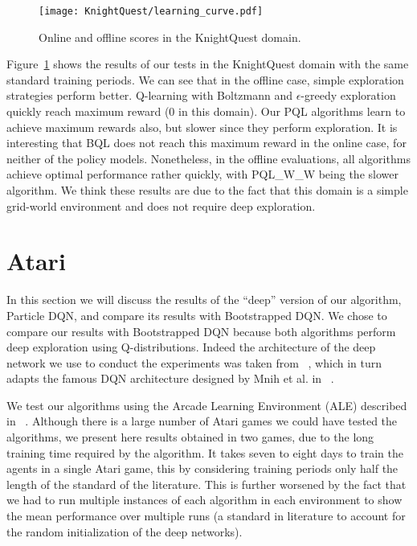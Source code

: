 \begin{figure}
 \texttt{[image: KnightQuest/learning\_curve.pdf]}
 \caption{Online and offline scores in the KnightQuest domain.}
 \label{fig:knightQuest_learning_curve}
\end{figure}
Figure~\ref{fig:knightQuest_learning_curve} shows the results of our tests in the KnightQuest domain with the same standard training periods. We can see that in the offline case, simple exploration strategies perform better. Q-learning with Boltzmann and $\epsilon$-greedy exploration quickly reach maximum reward (0 in this domain). Our PQL algorithms learn to achieve maximum rewards also, but slower since they perform exploration. It is interesting that BQL does not reach this maximum reward in the online case, for neither of the policy models. Nonetheless, in the offline evaluations, all algorithms achieve optimal performance rather quickly, with PQL\_W\_W being the slower algorithm. We think these results are due to the fact that this domain is a simple grid-world environment and does not require deep exploration.
\section{Atari}		 \label{sec:atari_experiments}
In this section we will discuss the results of the ``deep'' version of our algorithm, Particle DQN, and compare its results with Bootstrapped DQN. We chose to compare our results with Bootstrapped DQN because both algorithms perform deep exploration using Q-distributions. Indeed the architecture of the deep network we use to conduct the experiments was taken from ~\cite{DBLP:journals/corr/OsbandBPR16}, which in turn adapts the famous DQN architecture designed by Mnih et al. in ~\cite{mnih2015humanlevel}.\par
We test our algorithms using the Arcade Learning Environment (ALE) described in ~\cite{Bellemare:2013:ALE:2566972.2566979}. Although there is a large number of Atari games we could have tested the algorithms, we present here results obtained in two games, due to the long training time required by the algorithm. It takes seven to eight days to train the agents in a single Atari game, this by considering training periods only half the length of the standard of the literature. This is further worsened by the fact that we had to run multiple instances of each algorithm in each environment to show the mean performance over multiple runs (a standard in literature to account for the random initialization of the deep networks).
